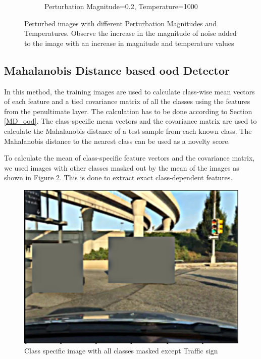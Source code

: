 \begin{figure}
\begin{subfigure}[t]{0.485\textwidth}
    		\caption{Perturbation Magnitude=0.2, Temperature=1000}
    	\end{subfigure}
    
    \caption[Images generated after perturbation and temperature scaling]{Perturbed images with different Perturbation Magnitudes and Temperatures. Observe the increase in the magnitude of noise added to the image with an increase in magnitude and temperature values}
    \label{fig:perturbed_image}
    \end{figure}
    
    \subsection{Mahalanobis Distance based \acrshort{ood} Detector}
    In this method, the training images are used to calculate class-wise mean vectors of each feature and a tied covariance matrix of all the classes using the features from the penultimate layer. The calculation has to be done according to Section \ref{MD_ood}. The class-specific mean vectors and the covariance matrix are used to calculate the Mahalanobis distance of a test sample from each known class. The Mahalanobis distance to the nearest class can be used as a novelty score.
    
    To calculate the mean of class-specific feature vectors and the covariance matrix, we used images with other classes masked out by the mean of the images as shown in Figure \ref{fig:class_specific_image}. This is done to extract exact class-dependent features. 
    
    \begin{figure}
        \centering
        \includegraphics[scale=0.15]{images/MD/rsz_1classspecific-image.png}
        \caption[Class specific images]{Class specific image with all classes masked except Traffic sign}
        \label{fig:class_specific_image}
    \end{figure}
    
